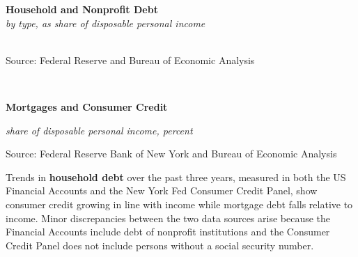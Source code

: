 \documentclass{report}
\makeatletter
\newcommand{\tbllink}[1]{\href{https://raw.githubusercontent.com/bdecon/US-chartbook/master/chartbook/data/#1}{\faTable}}
\newcommand*\short[1]{\expandafter\@gobbletwo\number\numexpr#1\relax}
\newcommand{\sbar}[4]{
		\addplot[ybar stacked, bar width=2.6pt, draw opacity=0, fill=#1] 
			table [x=#2, y=#3, col sep=comma]{#4};}
\newcommand{\dateaxisticks}{
		date coordinates in=x, axis line style={draw=none},
		xmax={2020-05-10},
		max space between ticks=40,	    
		xtick={{1990-01-01}, {1992-01-01}, {1994-01-01}, 
			{1996-01-01}, {1998-01-01}, {2000-01-01}, 
			{2002-01-01}, {2004-01-01}, {2006-01-01},
			{2008-01-01}, {2010-01-01}, {2012-01-01}, {2014-01-01},
		    {2016-01-01}, {2018-01-01}, {2020-01-01}},
		minor xtick={{1989-01-01}, {1991-01-01}, {1993-01-01},
			{1995-01-01}, {1997-01-01}, {1999-01-01}, 
			{2001-01-01}, {2003-01-01}, {2005-01-01}, {2007-01-01},
		    {2009-01-01}, {2011-01-01}, {2013-01-01}, {2015-01-01},
		    {2017-01-01}, {2019-01-01}},
		enlarge y limits={0.06}, enlarge x limits={0.01},
		}
\newcommand{\bbar}[2]{extra #1 ticks = {{#2}}, extra #1 tick labels = ,
		extra #1 tick style = {grid=major, grid style={thick, black!25}},}
\newcommand{\rbars}{
		\fill[color=black!10] (axis cs:{1990-07-01},\pgfkeysvalueof{/pgfplots/ymin}) rectangle 
			(axis cs:{1991-03-01}, \pgfkeysvalueof{/pgfplots/ymax});
		\fill[color=black!10] (axis cs:{2007-12-01},\pgfkeysvalueof{/pgfplots/ymin}) rectangle 
			(axis cs:{2009-07-01}, \pgfkeysvalueof{/pgfplots/ymax});
		\fill[color=black!10] (axis cs:{2001-03-01},\pgfkeysvalueof{/pgfplots/ymin}) rectangle 
			(axis cs:{2001-11-01}, \pgfkeysvalueof{/pgfplots/ymax});}
\makeatother
\begin{document}
{{{{\begin{minipage}{0.76\textwidth}
\vspace{1mm}

\noindent \normalsize \textbf{Household and Nonprofit Debt}\\
\footnotesize{\textit{by type, as share of disposable personal income}}\\
\noindent \hspace*{-2mm} \\
\footnotesize{Source: Federal Reserve and Bureau of Economic Analysis} \hfill \tbllink{hhdebt.csv}\\

\vspace{4mm}

\small  \\

\vspace{0mm}


\normalsize \textbf{Mortgages and Consumer Credit}

\footnotesize{\textit{share of disposable personal income, percent}} \\



\vspace{1mm}

\footnotesize{Source: Federal Reserve Bank of New York and Bureau of Economic Analysis}


\end{minipage}

\newpage


\begin{minipage}{0.76\textwidth}

\small Trends in \textbf{household debt} over the past three years, measured in both the US Financial Accounts and the New York Fed Consumer Credit Panel, show consumer credit growing in line with income while mortgage debt falls relative to income. Minor discrepancies between the two data sources arise because the Financial Accounts include debt of nonprofit institutions and the Consumer Credit Panel does not include persons without a social security number.\\


\end{minipage}}}}}
\end{document}

